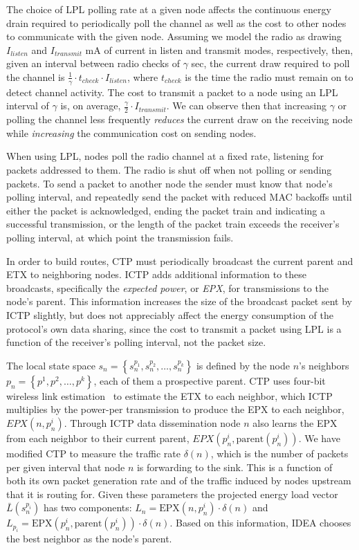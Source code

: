 The choice of LPL polling rate at a given node affects the continuous energy
drain required to periodically poll the channel as well as the cost to other
nodes to communicate with the given node. Assuming we model the radio as
drawing $I_{listen}$ and $I_{transmit}$ mA of current in listen and transmit
modes, respectively, then, given an interval between radio checks of $\gamma$
sec, the current draw required to poll the channel is $\frac{1}{\gamma} \cdot
t_{check} \cdot I_{listen}$, where $t_{check}$ is the time the radio must
remain on to detect channel activity. The cost to transmit a packet to a node
using an LPL interval of $\gamma$ is, on average, $\frac{\gamma}{2} \cdot
I_{transmit}$. We can observe then that increasing $\gamma$ or polling the
channel less frequently \textit{reduces} the current draw on the receiving
node while \textit{increasing} the communication cost on sending nodes.

When using LPL, nodes poll the radio channel at a fixed rate, listening for
packets addressed to them. The radio is shut off when not polling or sending
packets. To send a packet to another node the sender must know that node's
polling interval, and repeatedly send the packet with reduced MAC backoffs
until either the packet is acknowledged, ending the packet train and
indicating a successful transmission, or the length of the packet train
exceeds the receiver's polling interval, at which point the transmission
fails.

In order to build routes, CTP must periodically broadcast the current parent
and ETX to neighboring nodes. ICTP adds additional information to these
broadcasts, specifically the \textit{expected power}, or \textit{EPX}, for
transmissions to the node's parent. This information increases the size of
the broadcast packet sent by ICTP slightly, but does not appreciably affect
the energy consumption of the protocol's own data sharing, since the cost to
transmit a packet using LPL is a function of the receiver's polling interval,
not the packet size.

The local state space $s_n = \left\{s_n^{p_1}, s_n^{p_2}, \ldots, s_n^{p_k}
\right\}$ is defined by the node $n$'s neighbors $p_n = \left\{p^1, p^2,
\ldots, p^k \right\}$, each of them a prospective parent. CTP uses four-bit
wireless link estimation~\cite{Fonseca07} to estimate the ETX to each
neighbor, which ICTP multiplies by the power-per transmission to produce the
EPX to each neighbor, $EPX(n, p_n^i)$. Through ICTP data dissemination node
$n$ also learns the EPX from each neighbor to their current parent,
$EPX(p_n^i, \textrm{parent}(p_n^i))$. We have modified CTP to measure the
traffic rate $\delta(n)$, which is the number of packets per given interval
that node $n$ is forwarding to the sink. This is a function of both its own
packet generation rate and of the traffic induced by nodes upstream that it
is routing for. Given these parameters the projected energy load vector
$\bar{L}(s_n^{p_i})$ has two components: $L_n = \textrm{EPX}(n, p_n^i) \cdot
\delta(n)$ and $L_{p_i} = \textrm{EPX}(p_n^i, \textrm{parent}(p_n^i)) \cdot
\delta(n)$. Based on this information, IDEA chooses the best neighbor as the
node's parent.

